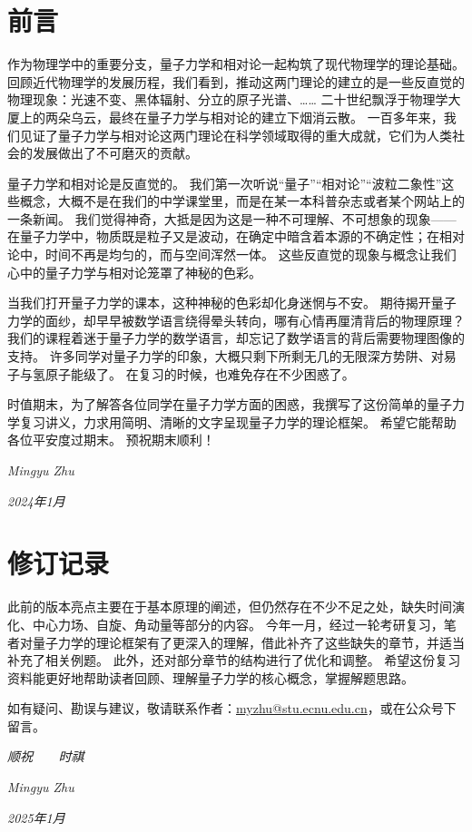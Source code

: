 
\section*{前言}

作为物理学中的重要分支，量子力学和相对论一起构筑了现代物理学的理论基础。
回顾近代物理学的发展历程，我们看到，推动这两门理论的建立的是一些反直觉的物理现象：光速不变、黑体辐射、分立的原子光谱、……
二十世纪飘浮于物理学大厦上的两朵乌云，最终在量子力学与相对论的建立下烟消云散。
一百多年来，我们见证了量子力学与相对论这两门理论在科学领域取得的重大成就，它们为人类社会的发展做出了不可磨灭的贡献。

量子力学和相对论是反直觉的。
我们第一次听说“量子”“相对论”“波粒二象性”这些概念，大概不是在我们的中学课堂里，而是在某一本科普杂志或者某个网站上的一条新闻。
我们觉得神奇，大抵是因为这是一种不可理解、不可想象的现象——在量子力学中，物质既是粒子又是波动，在确定中暗含着本源的不确定性；在相对论中，时间不再是均匀的，而与空间浑然一体。
这些反直觉的现象与概念让我们心中的量子力学与相对论笼罩了神秘的色彩。

当我们打开量子力学的课本，这种神秘的色彩却化身迷惘与不安。
期待揭开量子力学的面纱，却早早被数学语言绕得晕头转向，哪有心情再厘清背后的物理原理？
我们的课程着迷于量子力学的数学语言，却忘记了数学语言的背后需要物理图像的支持。
许多同学对量子力学的印象，大概只剩下所剩无几的无限深方势阱、对易子与氢原子能级了。
在复习的时候，也难免存在不少困惑了。

时值期末，为了解答各位同学在量子力学方面的困惑，我撰写了这份简单的量子力学复习讲义，力求用简明、清晰的文字呈现量子力学的理论框架。
希望它能帮助各位平安度过期末。
预祝期末顺利！

\hfill \textit{Mingyu Zhu}

\hfill \textit{2024年1月}

\pagebreak

\section*{修订记录}

此前的版本亮点主要在于基本原理的阐述，但仍然存在不少不足之处，缺失时间演化、中心力场、自旋、角动量等部分的内容。
今年一月，经过一轮考研复习，笔者对量子力学的理论框架有了更深入的理解，借此补齐了这些缺失的章节，并适当补充了相关例题。
此外，还对部分章节的结构进行了优化和调整。
希望这份复习资料能更好地帮助读者回顾、理解量子力学的核心概念，掌握解题思路。

如有疑问、勘误与建议，敬请联系作者：\href{mailto:myzhu@stu.ecnu.edu.cn}{myzhu@stu.ecnu.edu.cn}，或在公众号下留言。

\noindent \textit{顺祝~~~~时祺}

\hfill \textit{Mingyu Zhu}

\hfill \textit{2025年1月}
